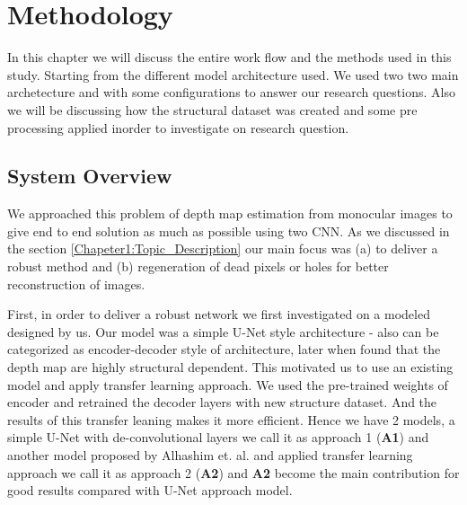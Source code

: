 
\chapter{Methodology}

\label{Chapter5:Methodology} 

In this chapter we will discuss the entire work flow and the methods used in this study. Starting from the different model architecture used. We used two two main archetecture and with some configurations to answer our research questions. Also we will be discussing how the structural dataset was created and some pre processing applied inorder to investigate on research question.


\section{System Overview}
We approached this problem of depth map estimation from monocular images to give end to end solution as much as possible using two CNN. As we discussed in the section \ref{Chapeter1:Topic_Description} our main focus was (a) to deliver a robust method and (b) regeneration of dead pixels or holes for better reconstruction of images. 

First, in order to deliver a robust network we first investigated on a modeled designed by us. Our model was a simple U-Net style architecture - also can be categorized as encoder-decoder style of architecture, later when found that the depth map are highly structural dependent. This motivated us to use an existing model and apply transfer learning approach. We used the pre-trained weights of encoder and retrained the decoder layers with new structure dataset. And the results of this transfer leaning makes it more efficient. Hence we have 2 models, a simple U-Net with de-convolutional layers we call it as approach 1  (\textbf{A1}) and another model proposed by Alhashim et. al. \cite{Alhashim2018} and applied transfer learning approach we call it as approach 2 (\textbf{A2}) and \textbf{A2} become the main contribution for good results compared with U-Net approach model. 

